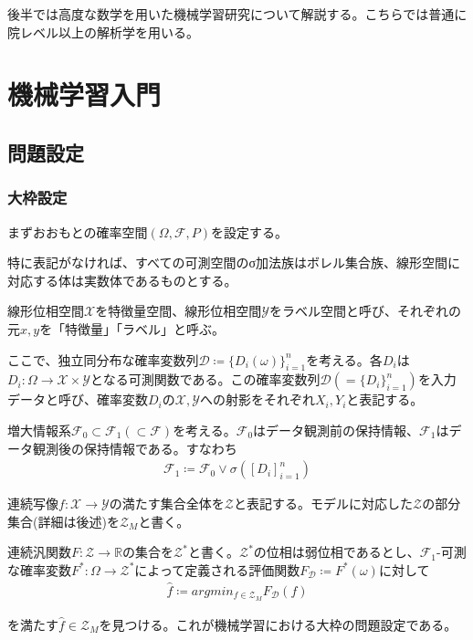 \documentclass[dvipdfmx, a4paper]{jsarticle}
\begin{document}
後半では高度な数学を用いた機械学習研究について解説する。こちらでは普通に院レベル以上の解析学を用いる。

\newpage
\section{機械学習入門}
\subsection{問題設定}
\subsubsection{大枠設定}
まずおおもとの確率空間$(\Omega,\mathcal{F},P)$を設定する。

特に表記がなければ、すべての可測空間のσ加法族はボレル集合族、線形空間に対応する体は実数体であるものとする。

線形位相空間$\mathcal{X}$を特徴量空間、線形位相空間$\mathcal{Y}$をラベル空間と呼び、それぞれの元$x,y$を「特徴量」「ラベル」と呼ぶ。

ここで、独立同分布な確率変数列$\mathcal{D}\coloneqq\{D_i(\omega)\}_{i=1}^n$を考える。各$D_i$は$D_i\colon\Omega\to\mathcal{X}\times\mathcal{Y}$となる可測関数である。この確率変数列$\mathcal{D}(=\{D_i\}_{i=1}^n)$を入力データと呼び、確率変数$D_i$の$\mathcal{X},\mathcal{Y}$への射影をそれぞれ$X_i,Y_i$と表記する。

増大情報系$\mathcal{F}_0\subset\mathcal{F}_1(\subset\mathcal{F})$を考える。$\mathcal{F}_0$はデータ観測前の保持情報、$\mathcal{F}_1$はデータ観測後の保持情報である。すなわち
\begin{align}
\mathcal{F}_1\coloneqq\mathcal{F}_0\vee\sigma([D_i]^n_{i=1})
\end{align}

連続写像$f\colon\mathcal{X}\to\mathcal{Y}$の満たす集合全体を$\mathcal{Z}$と表記する。モデルに対応した$\mathcal{Z}$の部分集合(詳細は後述)を$\mathcal{Z}_M$と書く。

連続汎関数$F\colon\mathcal{Z}\rightarrow\mathbb{R}$の集合を$\mathcal{Z}^*$と書く。$\mathcal{Z}^*$の位相は弱位相であるとし、$\mathcal{F}_1$-可測な確率変数$F^*\colon\Omega\rightarrow \mathcal{Z}^*$によって定義される評価関数$F_\mathcal{D}\coloneqq F^*(\omega)$に対して
\begin{align}
\hat{f}\coloneqq argmin_{f\in \mathcal{Z}_M}F_\mathcal{D}(f)
\end{align}

を満たす$\hat{f}\in \mathcal{Z}_M$を見つける。これが機械学習における大枠の問題設定である。
\end{document}
